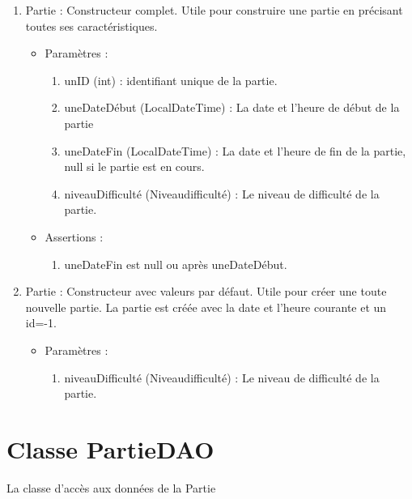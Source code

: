 \begin{itemize}
  \begin{enumerate}
  \item Partie : Constructeur complet. Utile pour construire une partie en précisant toutes ses caractéristiques.
    \begin{itemize}
    \item Paramètres : 
      \begin{enumerate}
      \item unID (int) : identifiant unique de la partie.
      \item uneDateDébut (LocalDateTime) : La date et l'heure de début de la partie
      \item uneDateFin (LocalDateTime) : La date et l'heure de fin de la partie, null si le partie est en cours.
      \item niveauDifficulté (Niveaudifficulté) : Le niveau de difficulté de la partie.
      \end{enumerate}
    \item Assertions : 
      \begin{enumerate}
      \item uneDateFin est null ou après uneDateDébut.
      \end{enumerate}
    \end{itemize}
  \item Partie : Constructeur avec valeurs par défaut. Utile pour créer une toute nouvelle partie. La partie est créée avec la date et l'heure courante et un id=-1.
    \begin{itemize}
    \item Paramètres : 
      \begin{enumerate}
      \item niveauDifficulté (Niveaudifficulté) : Le niveau de difficulté de la partie.
      \end{enumerate}
    \end{itemize}

  \end{enumerate}

\end{itemize}

\section{Classe PartieDAO}

La classe d'accès aux données de la Partie

